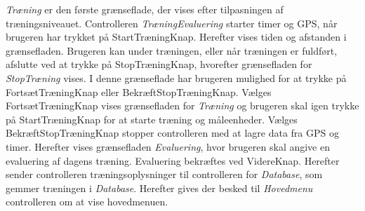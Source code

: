 \noindent
\textit{Træning} er den første grænseflade, der vises efter tilpasningen af træningsniveauet. Controlleren \textit{TræningEvaluering} starter timer og GPS, når brugeren har trykket på StartTræningKnap. Herefter vises tiden og afstanden i grænsefladen. Brugeren kan under træningen, eller når træningen er fuldført, afslutte ved at trykke på StopTræningKnap, hvorefter grænsefladen for \textit{StopTræning} vises. I denne grænseflade har brugeren mulighed for at trykke på FortsætTræningKnap eller BekræftStopTræningKnap. Vælges FortsætTræningKnap vises grænsefladen for \textit{Træning} og brugeren skal igen trykke på StartTræningKnap for at starte træning og måleenheder. Vælges BekræftStopTræningKnap stopper controlleren med at lagre data fra GPS og timer. Herefter vises grænsefladen \textit{Evaluering}, hvor brugeren skal angive en evaluering af dagens træning. Evaluering bekræftes ved VidereKnap. Herefter sender controlleren træningsoplysninger til controlleren for \textit{Database}, som gemmer træningen i \textit{Database}. Herefter gives der besked til \textit{Hovedmenu} controlleren om at vise hovedmenuen.



